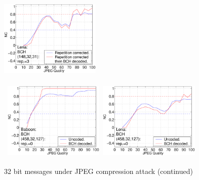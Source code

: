 \documentclass[12pt]{report}
\begin{document}
\begin{figure}[p]
{{\includegraphics[height=3.81cm,width=4.8cm]{EPS_BK_formattedBetter/ml32len148.eps} \\
}}
\centerline{ \hbox{
\includegraphics[height=3.81cm,width=4.8cm]{EPS_BK_formattedBetter/ml32bab458.eps}
\includegraphics[height=3.81cm,width=4.8cm]{EPS_BK_formattedBetter/ml32len458.eps}
}}
        \caption{32 bit messages under JPEG compression attack (continued)}
        \label{fig:32bBK32_63_148}
\end{figure}
\end{document}
